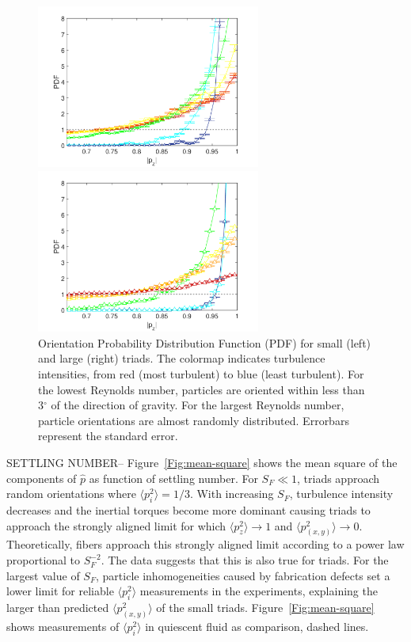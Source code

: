 \documentclass[]{jfm}
\begin{document}
\begin{figure}
\centering
\begin{minipage}{.5\textwidth}
  \centering
  \includegraphics[width=2.9in]{figures/orientation-PDF-small.pdf}
\end{minipage}%
\begin{minipage}{.5\textwidth}
  \centering
  \includegraphics[width=2.9in]{figures/orientation-PDF-large.pdf}
\end{minipage}

\caption{Orientation Probability Distribution Function (PDF) for small (left) and large (right) triads. The colormap indicates turbulence intensities, from red (most turbulent) to blue (least turbulent). For the lowest Reynolds number, particles are oriented within less than 3$^{\circ}$ of the direction of gravity. For the largest Reynolds number, particle orientations are almost randomly distributed. Errorbars represent the standard error. }
\label{Fig:orientation-PDF}
\end{figure}

SETTLING NUMBER-- Figure~\ref{Fig:mean-square} shows the mean square of the components of $\hat{p}$ as function of settling number.  For $S_F\ll1$, triads approach random orientations where $\langle p_i^2 \rangle = 1/3$.  With increasing $S_F$, turbulence intensity decreases and the inertial torques become more dominant causing triads to approach the strongly aligned limit for which $\langle p_z^2 \rangle \rightarrow 1$ and $\langle p_{(x,y)}^2 \rangle \rightarrow 0$.  Theoretically, fibers approach this strongly aligned limit according to a power law proportional to $S_F^{-2}$.  The data suggests that this is also true for triads.  For the largest value of $S_F$, particle inhomogeneities caused by fabrication defects set a lower limit for reliable $\langle p_i^2 \rangle$ measurements in the experiments, explaining the larger than predicted $\langle p_{(x,y)}^2 \rangle$ of the small triads.  Figure~\ref{Fig:mean-square} shows measurements of $\langle p_i^2 \rangle$ in quiescent fluid as comparison, dashed lines.  
\end{document}
